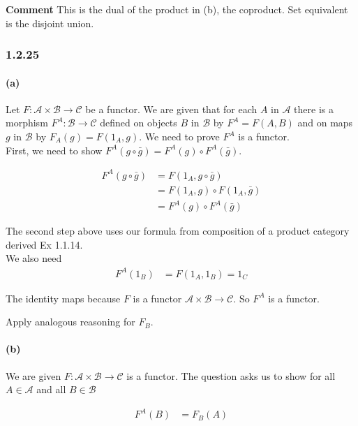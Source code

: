 \documentclass{article}
\begin{document}
\textbf{Comment} This is the dual of the product in (b), the coproduct. Set equivalent is the disjoint union.

\subsubsection*{1.2.25}

\paragraph{(a)}

Let $F: \mathcal{A} \times \mathcal{B} \rightarrow \mathcal{C}$ be a functor. We are given that for each $A$ in $\mathcal{A}$ there is a morphism $F^A: \mathcal{B} \rightarrow \mathcal{C}$ defined on objects $B$ in $\mathcal{B}$ by $F^A = F(A,B)$ and on maps $g$ in $\mathcal{B}$  by $F_A(g) = F(1_A, g)$. We need to prove $F^A$ is a functor.\\

First, we need to show  $F^A(g \circ \bar{g}) = F^A(g) \circ F^A(\bar{g})$.

\begin{align*}
  F^A(g \circ \bar{g})&= F(1_A, g \circ \bar{g})  \\
                           &= F(1_A,g) \circ F(1_A,\bar{g}) \\
                           &= F^A(g) \circ F^A(\bar{g})
\end{align*}

The second step above uses our formula from composition of a product category derived Ex 1.1.14. \\

We also need
\begin{align*}
F^A(1_B) &= F(1_A, 1_B) = 1_C
\end{align*}

The identity maps because $F$ is a functor $\mathcal{A} \times \mathcal{B} \rightarrow \mathcal{C}$. So $F^A$ is a functor.

Apply analogous reasoning for $F_B$.
\paragraph{(b)}

We are given $F: \mathcal{A} \times \mathcal{B} \rightarrow \mathcal{C}$ is a functor.
The question asks us to show for all $A \in \mathcal{A}$ and all $B \in \mathcal{B}$

\begin{align}
\label{eqn:1225b1}
  F^A(B) &= F_B(A)
\end{align}
\end{document}
